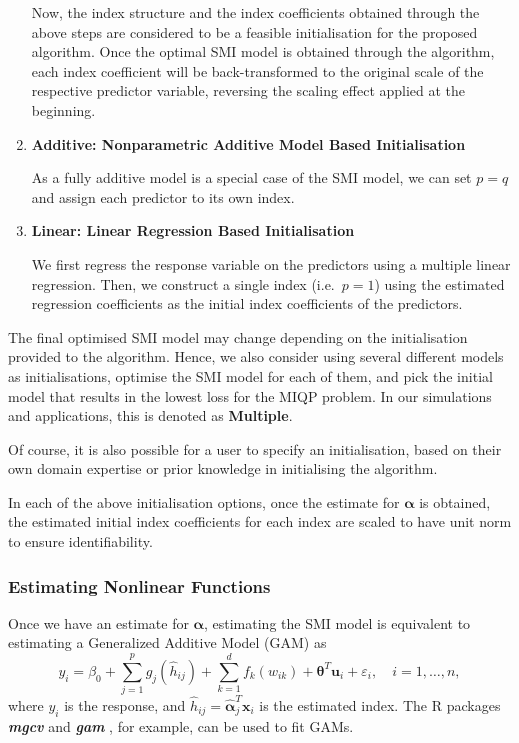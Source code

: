 \documentclass[
  11pt,
  a4paper,
]{article}
\begin{document}
\begin{enumerate}
  Now, the index structure and the index coefficients obtained through
  the above steps are considered to be a feasible initialisation for the
  proposed algorithm. Once the optimal SMI model is obtained through the
  algorithm, each index coefficient will be back-transformed to the
  original scale of the respective predictor variable, reversing the
  scaling effect applied at the beginning.
\item
  \textbf{Additive: Nonparametric Additive Model Based Initialisation}

  As a fully additive model is a special case of the SMI model, we can
  set \(p=q\) and assign each predictor to its own index.
\item
  \textbf{Linear: Linear Regression Based Initialisation}

  We first regress the response variable on the predictors using a
  multiple linear regression. Then, we construct a single index
  (i.e.~\(p = 1\)) using the estimated regression coefficients as the
  initial index coefficients of the predictors.
\end{enumerate}

The final optimised SMI model may change depending on the initialisation
provided to the algorithm. Hence, we also consider using several
different models as initialisations, optimise the SMI model for each of
them, and pick the initial model that results in the lowest loss for the
MIQP problem. In our simulations and applications, this is denoted as
\textbf{Multiple}.

Of course, it is also possible for a user to specify an initialisation,
based on their own domain expertise or prior knowledge in initialising
the algorithm.

In each of the above initialisation options, once the estimate for
\(\bm{\alpha}\) is obtained, the estimated initial index coefficients
for each index are scaled to have unit norm to ensure identifiability.

\subsubsection{Estimating Nonlinear Functions}\label{sec-step2}

Once we have an estimate for \(\bm{\alpha}\), estimating the SMI model
is equivalent to estimating a Generalized Additive Model (GAM) as \[
  y_{i} = \beta_{0} + \sum_{j = 1}^{p}g_{j}(\hat{h}_{ij}) + \sum_{k = 1}^{d}f_{k}(w_{ik}) + \bm{\theta}^{T}\bm{u}_{i} + \varepsilon_{i}, \quad i = 1, \dots, n,
\] where \(y_{i}\) is the response, and
\(\hat{h}_{ij} = \hat{\bm{\alpha}}_{j}^{T}\bm{x}_{i}\) is the estimated
index. The R packages \textbf{\emph{mgcv}} \autocite{Wood2011} and
\textbf{\emph{gam}} \autocite{Hastie2023}, for example, can be used to
fit GAMs.
\end{document}
